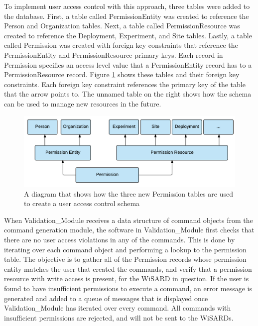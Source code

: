 To implement user access control with this approach, three tables were added to the database. First, a table called PermissionEntity was created to reference the Person and Organization tables. Next, a table called PermissionResource was created to reference the Deployment, Experiment, and Site tables. Lastly, a table called Permission was created with foreign key constraints that reference the PermissionEntity and PermissionResource primary keys. Each record in Permission specifies an access level value that a PermissionEntity record has to a PermissionResource record. Figure \ref{fig:uac_simplified} shows these tables and their foreign key constraints. Each foreign key constraint references the primary key of the table that the arrow points to. The unnamed table on the right shows how the schema can be used to manage new resources in the future.

\begin{figure}[H]
	\centering
	\includegraphics[width=\textwidth]{figures/uac_simplified.png}
	\caption{A diagram that shows how the three new Permission tables are used to create a user access control schema}
	\label{fig:uac_simplified}
\end{figure}

When Validation\_Module receives a data structure of command objects from the command generation module, the software in Validation\_Module first checks that there are no user access violations in any of the commands. This is done by iterating over each command object and performing a lookup to the permission table. The objective is to gather all of the Permission records whose permission entity matches the user that created the commands, and verify that a permission resource with write access is present, for the WiSARD in question. If the user is found to have insufficient permissions to execute a command, an error message is generated and added to a queue of messages that is displayed once Validation\_Module has iterated over every command. All commands with insufficient permissions are rejected, and will not be sent to the WiSARDs.

